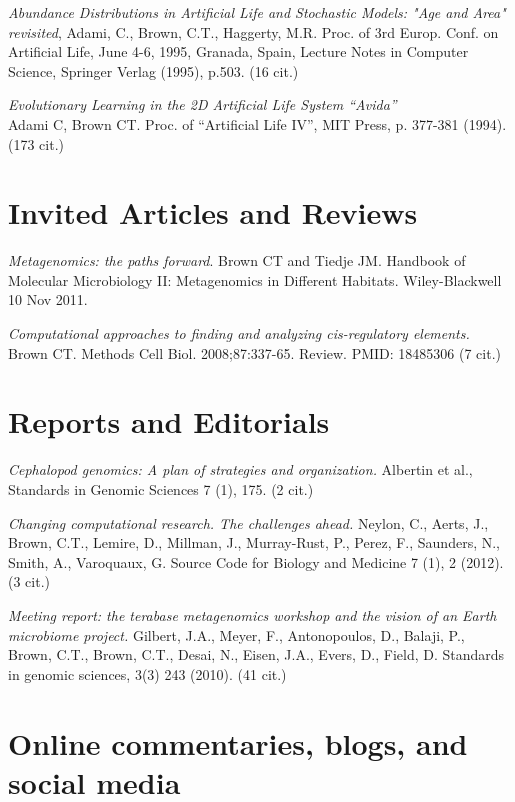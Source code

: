 \documentclass[margin,line]{resume}
\begin{document}
\begin{resume}
{\em Abundance Distributions in Artificial Life and Stochastic Models: "Age and
Area" revisited}, Adami, C., Brown, C.T., Haggerty, M.R.
Proc. of 3rd Europ. Conf. on Artificial Life, June 4-6, 1995,
Granada, Spain, Lecture Notes in Computer Science, Springer Verlag (1995),
p.503. (16 cit.)

{\em Evolutionary Learning in the 2D Artificial Life System ``Avida''}\\
Adami C, Brown CT. Proc. of ``Artificial Life IV'', MIT Press, p. 377-381
(1994).  (173 cit.)

\section{\mysidestyle Invited Articles and Reviews}

{\em Metagenomics: the paths forward}.  Brown CT and Tiedje JM.
Handbook of Molecular Microbiology II: Metagenomics in Different
Habitats.  Wiley-Blackwell 10 Nov 2011.

{\em Computational approaches to finding and analyzing cis-regulatory elements.} 
Brown CT. Methods Cell Biol. 2008;87:337-65. Review.
PMID: 18485306  (7 cit.)

\section{\mysidestyle Reports and Editorials}

{\em Cephalopod genomics: A plan of strategies and organization.} Albertin et al., Standards in Genomic Sciences 7 (1), 175. (2 cit.)

{\em Changing computational research. The challenges ahead.}
Neylon, C., Aerts, J., Brown, C.T., Lemire, D., Millman, J., Murray-Rust, P., Perez, F., Saunders, N., Smith, A., Varoquaux, G.
Source Code for Biology and Medicine 7 (1), 2 (2012). (3 cit.)

{\em Meeting report: the terabase metagenomics workshop and the vision of an Earth microbiome project.}
Gilbert, J.A., Meyer, F., Antonopoulos, D., Balaji, P., Brown, C.T., Brown, C.T., Desai, N., Eisen, J.A., Evers, D., Field, D. Standards in genomic sciences, 3(3) 243 (2010). (41 cit.)

\newpage

\section{\mysidestyle Online commentaries, blogs, and social media}


\end{resume}
\end{document}
